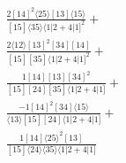 \documentclass[varwidth, border=5pt]{standalone}
\begin{document}
\begin{my}
$\begin{gathered}
\scriptscriptstyle\frac{2[14]^2⟨25⟩[13]⟨15⟩}{[15]⟨35⟩⟨1|2+4|1]^2}+\\
\scriptscriptstyle\frac{2⟨12⟩[13]^2[34][14]}{[15][35]⟨1|2+4|1]^2}+\\
\scriptscriptstyle\frac{1[14][13][34]^2}{[15][24][35]⟨1|2+4|1]}+\\
\scriptscriptstyle\frac{-1[14]^2[34]⟨15⟩}{⟨13⟩[15][24]⟨1|2+4|1]}+\\
\scriptscriptstyle\frac{1[14]⟨25⟩^2[13]}{[15]⟨24⟩⟨35⟩⟨1|2+4|1]}\phantom{+}
\end{gathered}$
\end{my}
\end{document}

